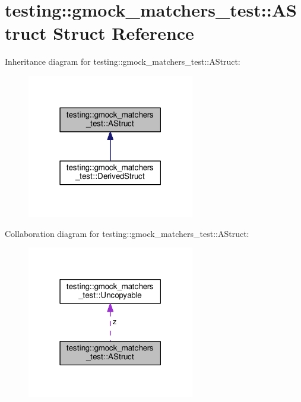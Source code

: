 \hypertarget{structtesting_1_1gmock__matchers__test_1_1AStruct}{}\section{testing\+:\+:gmock\+\_\+matchers\+\_\+test\+:\+:A\+Struct Struct Reference}
\label{structtesting_1_1gmock__matchers__test_1_1AStruct}


Inheritance diagram for testing\+:\+:gmock\+\_\+matchers\+\_\+test\+:\+:A\+Struct\+:\nopagebreak
\begin{figure}[H]
\begin{center}
\leavevmode
\includegraphics[width=207pt]{structtesting_1_1gmock__matchers__test_1_1AStruct__inherit__graph}
\end{center}
\end{figure}


Collaboration diagram for testing\+:\+:gmock\+\_\+matchers\+\_\+test\+:\+:A\+Struct\+:\nopagebreak
\begin{figure}[H]
\begin{center}
\leavevmode
\includegraphics[width=207pt]{structtesting_1_1gmock__matchers__test_1_1AStruct__coll__graph}
\end{center}
\end{figure}
